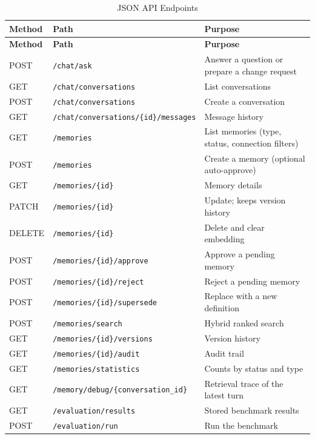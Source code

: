 \begingroup
\footnotesize
\renewcommand{\arraystretch}{0.9}
\begin{longtable}{p{1.2cm} p{7.4cm} p{6.4cm}}
    \caption{JSON API Endpoints}
    \label{tab:api} \\
    \toprule
    \textbf{Method} & \textbf{Path} & \textbf{Purpose} \\
    \midrule
    \endfirsthead
    \toprule
    \textbf{Method} & \textbf{Path} & \textbf{Purpose} \\
    \midrule
    \endhead
    POST   & \texttt{/chat/ask} & Answer a question or prepare a change request \\
    GET    & \texttt{/chat/conversations} & List conversations \\
    POST   & \texttt{/chat/conversations} & Create a conversation \\
    GET    & \texttt{/chat/conversations/\{id\}/messages} & Message history \\
    GET    & \texttt{/memories} & List memories (type, status, connection filters) \\
    POST   & \texttt{/memories} & Create a memory (optional auto-approve) \\
    GET    & \texttt{/memories/\{id\}} & Memory details \\
    PATCH  & \texttt{/memories/\{id\}} & Update; keeps version history \\
    DELETE & \texttt{/memories/\{id\}} & Delete and clear embedding \\
    POST   & \texttt{/memories/\{id\}/approve} & Approve a pending memory \\
    POST   & \texttt{/memories/\{id\}/reject} & Reject a pending memory \\
    POST   & \texttt{/memories/\{id\}/supersede} & Replace with a new definition \\
    POST   & \texttt{/memories/search} & Hybrid ranked search \\
    GET    & \texttt{/memories/\{id\}/versions} & Version history \\
    GET    & \texttt{/memories/\{id\}/audit} & Audit trail \\
    GET    & \texttt{/memories/statistics} & Counts by status and type \\
    GET    & \texttt{/memory/debug/\{conversation\_id\}} & Retrieval trace of the latest turn \\
    GET    & \texttt{/evaluation/results} & Stored benchmark results \\
    POST   & \texttt{/evaluation/run} & Run the benchmark \\

\end{longtable}
